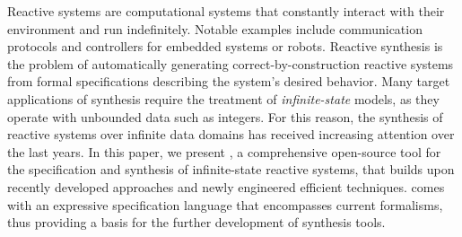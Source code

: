 Reactive systems are computational systems that constantly interact with their environment and run indefinitely.  Notable examples include communication protocols and controllers for embedded systems or robots.  Reactive synthesis is the problem of automatically generating correct-by-construction reactive systems from formal specifications describing the system's desired behavior.
Many target applications of synthesis require the treatment of \emph{infinite-state} models,  as they operate with unbounded data such as integers.
For this reason, the synthesis of reactive systems over infinite data domains has received increasing  attention over the last years.  In this paper, we present \issy, a comprehensive open-source  tool for the specification and synthesis of infinite-state reactive systems,  that builds upon recently developed approaches and newly engineered efficient techniques.
\issy{} comes with an expressive specification language that encompasses current formalisms,  thus providing a basis for the further development of synthesis tools.



